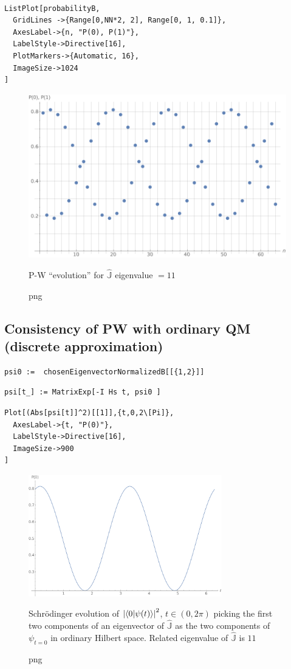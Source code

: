 \begin{Verbatim}

ListPlot[probabilityB,
  GridLines ->{Range[0,NN*2, 2], Range[0, 1, 0.1]},
  AxesLabel->{n, "P(0), P(1)"},
  LabelStyle->Directive[16],
  PlotMarkers->{Automatic, 16},
  ImageSize->1024
]
\end{Verbatim}
\begin{figure}[!h]
  \centering
  \includegraphics[width=.75\textwidth]{img/N32-B.png}
  \caption[]{png}{P-W ``evolution'' for $\hat{\mathbb{J}}$ eigenvalue $=11$}
\end{figure}

\subsection{Consistency of PW with ordinary QM (discrete approximation)}

\begin{Verbatim}
psi0 :=  chosenEigenvectorNormalizedB[[{1,2}]]
\end{Verbatim}

\begin{Verbatim}
psi[t_] := MatrixExp[-I Hs t, psi0 ]
\end{Verbatim}

\begin{Verbatim}
Plot[(Abs[psi[t]]^2)[[1]],{t,0,2\[Pi]},
  AxesLabel->{t, "P(0)"},
  LabelStyle->Directive[16],
  ImageSize->900
]
\end{Verbatim}
\begin{figure}[!h]
  \centering
  \includegraphics[width=0.75\textwidth]{img/probB_0.png}
  \caption[]{png}{
    Schr{\"o}dinger evolution of
    $\qty|\braket{0}{\psi(t)}|^2$, $t \in (0, 2\pi) $
    picking the first two components of an eigenvector of $\hat{\mathbb{J}}$
    as the two components of $\psi_{t=0}$ in ordinary Hilbert space.
    Related eigenvalue of $\hat{\mathbb{J}}$ is $11$
  }
\end{figure}

